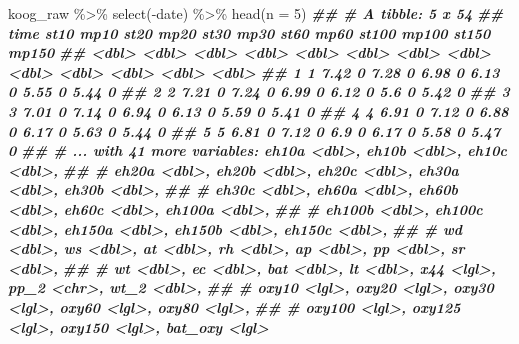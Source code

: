 \documentclass[
]{article}
\newenvironment{Shaded}{\begin{snugshade}}{\end{snugshade}}
\newcommand{\AttributeTok}[1]{\textcolor[rgb]{0.77,0.63,0.00}{#1}}
\newcommand{\DecValTok}[1]{\textcolor[rgb]{0.00,0.00,0.81}{#1}}
\newcommand{\DocumentationTok}[1]{\textcolor[rgb]{0.56,0.35,0.01}{\textbf{\textit{#1}}}}
\newcommand{\FunctionTok}[1]{\textcolor[rgb]{0.00,0.00,0.00}{#1}}
\newcommand{\NormalTok}[1]{#1}
\newcommand{\SpecialCharTok}[1]{\textcolor[rgb]{0.00,0.00,0.00}{#1}}
\begin{document}
\begin{Shaded}
\begin{Highlighting}[]
\NormalTok{koog\_raw }\SpecialCharTok{\%\textgreater{}\%}
  \FunctionTok{select}\NormalTok{(}\SpecialCharTok{{-}}\NormalTok{date) }\SpecialCharTok{\%\textgreater{}\%}
  \FunctionTok{head}\NormalTok{(}\AttributeTok{n =} \DecValTok{5}\NormalTok{)}
\DocumentationTok{\#\# \# A tibble: 5 x 54}
\DocumentationTok{\#\#    time  st10  mp10  st20  mp20  st30  mp30  st60  mp60 st100 mp100 st150 mp150}
\DocumentationTok{\#\#   \textless{}dbl\textgreater{} \textless{}dbl\textgreater{} \textless{}dbl\textgreater{} \textless{}dbl\textgreater{} \textless{}dbl\textgreater{} \textless{}dbl\textgreater{} \textless{}dbl\textgreater{} \textless{}dbl\textgreater{} \textless{}dbl\textgreater{} \textless{}dbl\textgreater{} \textless{}dbl\textgreater{} \textless{}dbl\textgreater{} \textless{}dbl\textgreater{}}
\DocumentationTok{\#\# 1     1  7.42     0  7.28     0  6.98     0  6.13     0  5.55     0  5.44     0}
\DocumentationTok{\#\# 2     2  7.21     0  7.24     0  6.99     0  6.12     0  5.6      0  5.42     0}
\DocumentationTok{\#\# 3     3  7.01     0  7.14     0  6.94     0  6.13     0  5.59     0  5.41     0}
\DocumentationTok{\#\# 4     4  6.91     0  7.12     0  6.88     0  6.17     0  5.63     0  5.44     0}
\DocumentationTok{\#\# 5     5  6.81     0  7.12     0  6.9      0  6.17     0  5.58     0  5.47     0}
\DocumentationTok{\#\# \# ... with 41 more variables: eh10a \textless{}dbl\textgreater{}, eh10b \textless{}dbl\textgreater{}, eh10c \textless{}dbl\textgreater{},}
\DocumentationTok{\#\# \#   eh20a \textless{}dbl\textgreater{}, eh20b \textless{}dbl\textgreater{}, eh20c \textless{}dbl\textgreater{}, eh30a \textless{}dbl\textgreater{}, eh30b \textless{}dbl\textgreater{},}
\DocumentationTok{\#\# \#   eh30c \textless{}dbl\textgreater{}, eh60a \textless{}dbl\textgreater{}, eh60b \textless{}dbl\textgreater{}, eh60c \textless{}dbl\textgreater{}, eh100a \textless{}dbl\textgreater{},}
\DocumentationTok{\#\# \#   eh100b \textless{}dbl\textgreater{}, eh100c \textless{}dbl\textgreater{}, eh150a \textless{}dbl\textgreater{}, eh150b \textless{}dbl\textgreater{}, eh150c \textless{}dbl\textgreater{},}
\DocumentationTok{\#\# \#   wd \textless{}dbl\textgreater{}, ws \textless{}dbl\textgreater{}, at \textless{}dbl\textgreater{}, rh \textless{}dbl\textgreater{}, ap \textless{}dbl\textgreater{}, pp \textless{}dbl\textgreater{}, sr \textless{}dbl\textgreater{},}
\DocumentationTok{\#\# \#   wt \textless{}dbl\textgreater{}, ec \textless{}dbl\textgreater{}, bat \textless{}dbl\textgreater{}, lt \textless{}dbl\textgreater{}, x44 \textless{}lgl\textgreater{}, pp\_2 \textless{}chr\textgreater{}, wt\_2 \textless{}dbl\textgreater{},}
\DocumentationTok{\#\# \#   oxy10 \textless{}lgl\textgreater{}, oxy20 \textless{}lgl\textgreater{}, oxy30 \textless{}lgl\textgreater{}, oxy60 \textless{}lgl\textgreater{}, oxy80 \textless{}lgl\textgreater{},}
\DocumentationTok{\#\# \#   oxy100 \textless{}lgl\textgreater{}, oxy125 \textless{}lgl\textgreater{}, oxy150 \textless{}lgl\textgreater{}, bat\_oxy \textless{}lgl\textgreater{}}
\end{Highlighting}
\end{Shaded}
\end{document}
